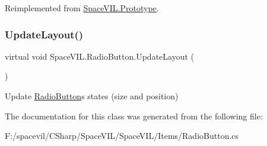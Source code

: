 Reimplemented from \mbox{\hyperlink{class_space_v_i_l_1_1_prototype}{Space\+V\+I\+L.\+Prototype}}.

\mbox{\label{class_space_v_i_l_1_1_radio_button_a899b3a81136fe60e0ad2b1aace9db40c}} 
\subsubsection{\texorpdfstring{Update\+Layout()}{UpdateLayout()}}
{\footnotesize\ttfamily virtual void Space\+V\+I\+L.\+Radio\+Button.\+Update\+Layout (\begin{DoxyParamCaption}{ }\end{DoxyParamCaption})\hspace{0.3cm}{\ttfamily [virtual]}}



Update \mbox{\hyperlink{class_space_v_i_l_1_1_radio_button}{Radio\+Button}}\textquotesingle{}s states (size and position) 



The documentation for this class was generated from the following file\+:\begin{DoxyCompactItemize}
\item 
F\+:/spacevil/\+C\+Sharp/\+Space\+V\+I\+L/\+Space\+V\+I\+L/\+Items/Radio\+Button.\+cs\end{DoxyCompactItemize}
